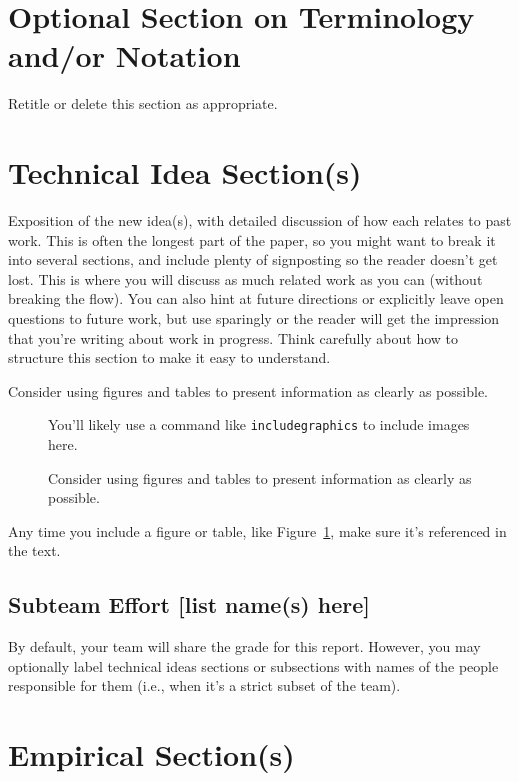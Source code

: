 \documentclass[11pt,letterpaper]{article}
\begin{document}
\section{Optional Section on Terminology and/or Notation}

Retitle or delete this section as appropriate.

\section{Technical Idea Section(s)}

Exposition of the new idea(s), with detailed discussion of how each relates to past work.  This is often the longest part of the paper, so you might want to break it into several sections, and include plenty of signposting so the reader doesn’t get lost.  This is where you will discuss as much related work as you can (without breaking the flow).  You can also hint at future directions or explicitly leave open questions to future work, but use sparingly or the reader will get the impression that you’re writing about work in progress.  Think carefully about how to structure this section to make it easy to understand.

Consider using figures and tables to present information as clearly as possible.

\begin{figure}
\begin{center}You'll likely use a command like \texttt{includegraphics} to include images here.\end{center}
\caption{\label{fig:foo} Consider using figures and tables to present information as clearly as possible.}
\end{figure}

Any time you include a figure or table, like Figure~\ref{fig:foo}, make sure it's referenced in the text.

\subsection{Subteam Effort [list name(s) here]}

By default, your team will share the grade for this report.  However, you may optionally label technical ideas sections or subsections with names of the people responsible for them (i.e., when it's a strict subset of the team).



\section{Empirical Section(s)} 
\end{document}
